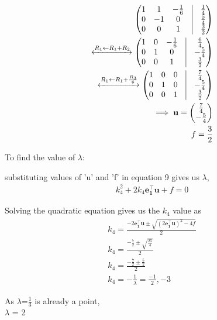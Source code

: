 \documentclass[8pt,a4paper]{report}
\newcommand{\myvec}[1]{\ensuremath{\begin{pmatrix}#1\end{pmatrix}}}
\let\vec\mathbf
\begin{document}
\begin{multicols}{2}
\begin{align*}
			       \myvec{
				       1 & 1 & -\frac{1}{6}&\vrule & \frac{1}{4}
				       \\
				       0 & -1  &0&\vrule & \frac{5}{4}
				       \\
				       0&0&1&\vrule&\frac{3}{2}
				       }
				       \\
                               \xleftrightarrow[]{R_1 \leftarrow R_1+R_2 }
			       \myvec{
				       1 & 0 & -\frac{1}{6}&\vrule & \frac{6}{4}
			              \\
				      0 & 1 &0&\vrule & -\frac{5}{4}
				      \\
				      0&0&1&\vrule&\frac{3}{2}
				      }
				      \\
                             \xleftrightarrow[]{R_1 \leftarrow R_1+\frac{R_3}{6} }
                                 \myvec{
					 1&0&0&\vrule&\frac{7}{4}
					 \\
					 0&1&0&\vrule&-\frac{5}{4}
					 \\
					 0&0&1&\vrule&\frac{3}{2}
					 }
                                          \\
                   \implies \vec{u} =\myvec{\frac{7}{4}\\-\frac{5}{4}}\\
		                f  = \frac{3}{2}
                      \end{align*}
\raggedright To find the value of $\lambda$: \\
\raggedright substituting values of 'u' and 'f' in equation 9 gives us $\lambda$,
                      \begin{align*}
                                       k_4^2 +2k_4\vec{e_1^{\top}}\vec{u} +f =0
                         \end{align*}
              \raggedright Solving the quadratic equation gives us the $k_4$ value as
                    \begin{align*}
			    k_4 =  \frac{-2\vec{e_1^{\top}}\vec{u}\pm\sqrt{(2\vec{e_1^{\top}}\vec{u})^2-4f}}{2}
			    \\ k_4 = \frac{-\frac{7}{2}\pm\sqrt{\frac{25}{4}}}{2}
			    \\ k_4 =  \frac{-\frac{7}{2}\pm\frac{5}{2}}{2}
			    \\ k_4 = -\frac{1}{\lambda} = \frac{-1}{2},-3
                     \end{align*}       	    
		     \raggedright As $\lambda$=$\frac{1}{3}$ is already a point, \\
		            \centering $\lambda$ = 2 \\

\end{multicols}
\end{document}
